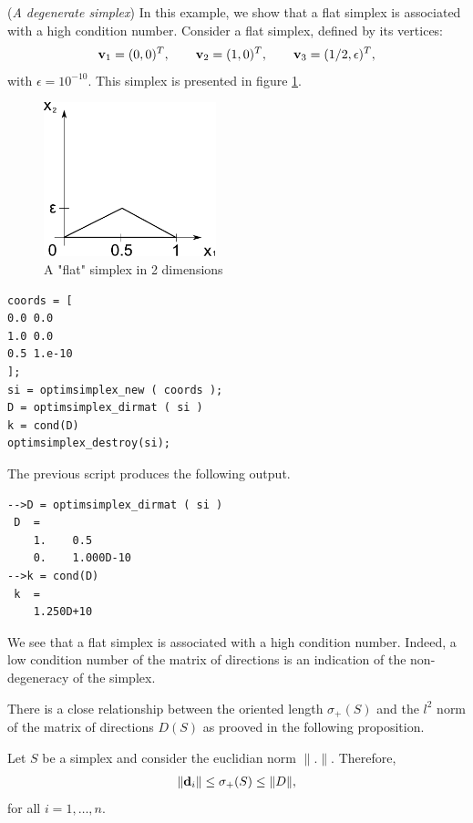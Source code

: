 \begin{example}
(\emph{A degenerate simplex})
In this example, we show that a flat simplex is associated 
with a high condition number.
Consider a flat simplex, defined by its vertices:
\begin{eqnarray}
\mathbf{v}_1=(0,0)^T, \qquad \mathbf{v}_2=(1,0)^T, \qquad \mathbf{v}_3=(1/2,\epsilon)^T,
\end{eqnarray}
with $\epsilon = 10^{-10}$. This simplex is presented in figure \ref{fig-simplex-flat}.

\begin{figure}
\begin{center}
\includegraphics[width=5cm]{simplex_flat.pdf}
\end{center}
\caption{A "flat" simplex in 2 dimensions}
\label{fig-simplex-flat}
\end{figure}

\lstset{language=scilabscript}
\begin{lstlisting}
coords = [
0.0 0.0
1.0 0.0
0.5 1.e-10
];
si = optimsimplex_new ( coords );
D = optimsimplex_dirmat ( si )
k = cond(D)
optimsimplex_destroy(si);
\end{lstlisting}
The previous script produces the following output.
\lstset{language=scilabscript}
\begin{lstlisting}
-->D = optimsimplex_dirmat ( si )
 D  =
    1.    0.5        
    0.    1.000D-10  
-->k = cond(D)
 k  =
    1.250D+10  
\end{lstlisting}
We see that a flat simplex is associated with a high 
condition number. Indeed, a low condition number of the matrix of 
directions is an indication of the non-degeneracy of the simplex.
\end{example}

There is a close relationship between the oriented length
$\sigma_+(S)$ and the $l^2$ norm of the matrix of directions 
$D(S)$ as prooved in the following proposition.

\begin{proposition}
\label{prop-simplex-inequalitysigmaplus}
Let $S$ be a simplex and consider the euclidian norm $\|.\|$.
Therefore,
\begin{eqnarray}
\label{eq-simplex-inequalitysigmaplus}
\|\mathbf{d}_i\| \leq \sigma_+(S) \leq \|D\|,
\end{eqnarray}
for all $i=1,\ldots,n$.
\end{proposition}

